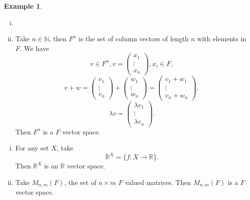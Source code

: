 \documentclass[12pt]{article}
\theoremstyle{definition}
\newtheorem{example}{Example}[section]
\theoremstyle{remark}
\begin{document}
\begin{adjustbox}{minipage = \columnwidth - 25.5pt, margin=1em, frame=1pt, margin=0em}
\begin{example}
	\begin{enumerate}[(i)]
		\item[]
		\item Take $n \in \mathbb{N}$, then $F^{n}$ is the set of column vectors of length $n$ with elements in $F$. We have
			\[
			v \in F^{n}, v =
			\begin{pmatrix}
				x_1 \\
				\vdots \\
				x_n
			\end{pmatrix}
			, x_i \in F
			,\]
			\[
			v + w =
			\begin{pmatrix}
				v_1 \\
				\vdots \\
				v_n
			\end{pmatrix}
			+
			\begin{pmatrix}
				w_1 \\
				\vdots \\
				w_n
			\end{pmatrix}
			=
			\begin{pmatrix}
				v_1 + w_1 \\
				\vdots \\
				v_n + w_n
			\end{pmatrix}
			,\]
			\[
			\lambda v =
			\begin{pmatrix}
				\lambda v_1 \\
				\vdots \\
				\lambda v_n
			\end{pmatrix}
			.\]
			Then $F^{n}$ is a $F$ vector space.
	\end{enumerate}
	
\end{example}

\end{adjustbox}

\begin{adjustbox}{minipage = \columnwidth - 25.5pt, margin=1em, frame=1pt, margin=0em}
	\begin{enumerate}[(i)]
		\item For any set $X$, take
			\[
				\mathbb{R}^{X} = \{f : X \to \mathbb{R}\}
			.\]
			Then $\mathbb{R}^{X}$ is an $\mathbb{R}$ vector space.
		\item Take $M_{n, m}(F)$, the set of $n \times m$ $F$ valued matrices. Then $M_{n, m}(F)$ is a $F$ vector space.
\end{enumerate}

\end{adjustbox}
\end{document}
